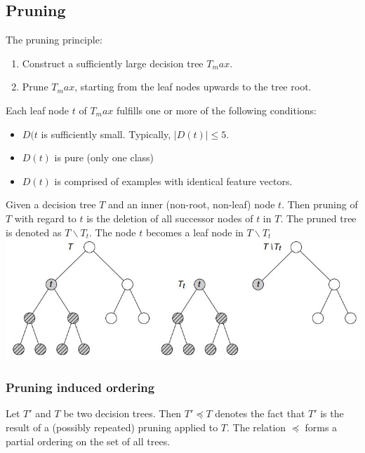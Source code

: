 \documentclass[11pt,a4paper]{article}
\begin{document}
\begin{flushleft}
\subsection{Pruning}
The pruning principle:
\begin{enumerate}
\item Construct a sufficiently large decision tree $T_max$.
\item Prune $T_max$, starting from the leaf nodes upwards to the tree root.
\end{enumerate}
Each leaf node $t$ of $T_max$ fulfills one or more of the following conditions:
\begin{itemize}
\item $D(t$ is sufficiently small. Typically, $|D(t)| \leq 5$.
\item $D(t)$ is pure (only one class)
\item $D(t)$ is comprised of examples with identical feature vectors.
\end{itemize}
Given a decision tree $T$ and an inner (non-root, non-leaf) node $t$. Then pruning of $T$
with regard to $t$ is the deletion of all successor nodes of $t$ in $T$. The pruned tree is
denoted as $T \backslash T_t$. The node $t$ becomes a leaf node in $T \backslash T_t$
\includegraphics[width = \textwidth]{pruning}

\subsubsection{Pruning induced ordering}
Let $T'$ and $T$ be two decision trees. Then $T' \preceq T$ denotes the fact that $T'$ is the
result of a (possibly repeated) pruning applied to $T$. The relation $\preceq$ forms a partial
ordering on the set of all trees.\\


\end{flushleft}
\end{document}
